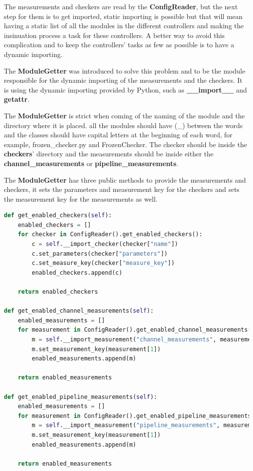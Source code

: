 The measurements and checkers are read by the \textbf{ConfigReader}, but the next step for them is to get
imported, static importing is possible but that will mean having a static list of all the modules in the
different controllers and making the insinuation process a task for these controllers. A better way to avoid
this complication and to keep the controllers' tasks as few as possible is to have a dynamic importing.

The \textbf{ModuleGetter} was introduced to solve this problem and to be the module responsible for the dynamic
importing of the measurements and the checkers. It is using the dynamic importing provided by Python, such as
\textbf{\_\_import\_\_} and \textbf{getattr}.

The \textbf{ModuleGetter} is strict when coming of the naming of the module and the directory where it is
placed. all the modules should have (\_) between the words and the classes should have capital letters at the beginning
of each word, for example, frozen\_checker.py and FrozenChecker. The checker should be inside the
\textbf{checkers}' directory and the measurements should be inside either the \textbf{channel\_measurements} or
\textbf{pipeline\_measurements}.

The \textbf{ModuleGetter} has three public methods to provide the measurements and checkers, it sets the
parameters and measurement key for the checkers and sets the measurement key for the measurements as well.
\newline
\begin{lstlisting}[language=Python, caption={Puplic methods of the ModuleGetter},captionpos=b]
def get_enabled_checkers(self):
	enabled_checkers = []
	for checker in ConfigReader().get_enabled_checkers():
		c = self.__import_checker(checker["name"])
		c.set_parameters(checker["parameters"])
		c.set_measure_key(checker["measure_key"])
		enabled_checkers.append(c)

	return enabled_checkers

def get_enabled_channel_measurements(self):
	enabled_measurements = []
	for measurement in ConfigReader().get_enabled_channel_measurements():
		m = self.__import_measurement("channel_measurements", measurement[0])
		m.set_measurement_key(measurement[1])
		enabled_measurements.append(m)

	return enabled_measurements

def get_enabled_pipeline_measurements(self):
	enabled_measurements = []
	for measurement in ConfigReader().get_enabled_pipeline_measurements():
		m = self.__import_measurement("pipeline_measurements", measurement[0])
		m.set_measurement_key(measurement[1])
		enabled_measurements.append(m)

	return enabled_measurements
\end{lstlisting}

